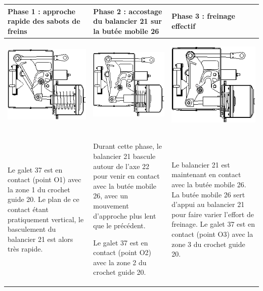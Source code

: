 \documentclass[11pt,oneside]{article}
\begin{document}
\begin{center}
\begin{tabular}{|p{}|p{}|p{}|}
\hline 
Phase 1 : approche rapide des sabots de freins &
Phase 2 : accostage du balancier 21 sur la butée mobile 26 & 
Phase 3 : freinage effectif \\
\hline
\begin{center}
\includegraphics[width=.3\textwidth]{png/img2}
\end{center}&
\begin{center}
\includegraphics[width=.3\textwidth]{png/img3}
\end{center}&
\begin{center}
\includegraphics[width=.3\textwidth]{png/img4} 
\end{center}\\
\hline
Le galet 37 est en contact (point O1) avec la zone 1 du crochet guide 20. Le plan de ce contact étant pratiquement vertical, le basculement du balancier 21 est alors très rapide.&
Durant cette phase, le balancier 21 bascule autour de l'axe 22 pour venir en contact avec la butée 
mobile 26, avec un mouvement d'approche plus lent que le précédent.

Le galet 37 est en contact (point O2) avec la zone 2 du crochet guide 20.&

	Le balancier 21 est maintenant en contact avec la butée mobile 26. 
La butée mobile 26 sert d'appui au balancier 21  pour faire varier l'effort de freinage.
Le galet 37 est en contact (point O3) avec la zone 3 du crochet guide 20. \\
\hline
\end{tabular}
\end{center}
	
\end{document}
